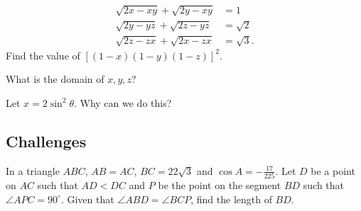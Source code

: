 \documentclass[../jarvis.tex]{subfiles}
\begin{document}
\begin{align*}
    \sqrt{2x-xy}+\sqrt{2y-xy}&=1 \\
    \sqrt{2y-yz}+\sqrt{2z-yz}&=\sqrt{2} \\
    \sqrt{2z-zx}+\sqrt{2x-zx}&=\sqrt{3}.
\end{align*}
Find the value of $[(1-x)(1-y)(1-z)]^2.$\begin{hints}
    \begin{hint}
        What is the domain of $x,y,z$?
    \end{hint}
    \begin{hint}
        Let $x=2\sin^2{\theta}$. Why can we do this?
    \end{hint}
\end{hints}

\subsection{Challenges}
\problem[2017 SMO(O) P25]In a triangle $ABC$, $AB=AC$, $BC=22\sqrt{3}$ and $\cos{A}=-\frac{17}{225}$. Let $D$ be a point on $AC$ such that $AD<DC$ and $P$ be the point on the segment $BD$ such that $\angle APC=90^{\circ}$. Given that $\angle ABD=\angle BCP$, find the length of $BD$.
\end{document}

